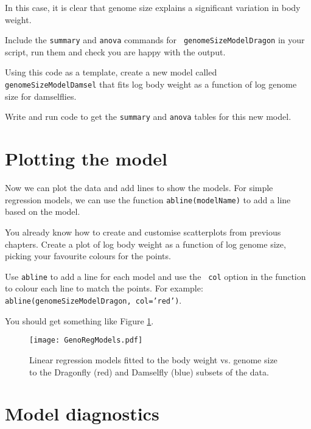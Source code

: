 In this case, it is clear that genome size explains a significant 
variation in body weight. 

\begin{compactitem}[$\quad\star$]
	\item Include the {\tt summary} and {\tt anova} commands for {\tt 
	genomeSizeModelDragon} in your script, run them and check you are 
	happy with the output.
	\item Using this code as a template, create a new model called {\tt 
	genomeSizeModelDamsel} that fits log body weight as a function of log 
	genome size for damselflies.
	\item Write and run code to get the  {\tt summary} and {\tt anova} 
	tables for this new model.
\end{compactitem}

\section{Plotting the model}

Now we can plot the data and add lines to show the models. For simple 
regression models, we can use the function {\tt abline(modelName)} to 
add a line based on the model.
\begin{compactitem}[$\quad\star$]
 \item You already know how to create and customise scatterplots from 
 previous chapters. Create a plot of log body weight as a function of 
 log genome size, picking your favourite colours for the points.
 \item Use {\tt abline} to add a line for each model and use the {\tt 
 col} option in the function to colour each line to match the points. 
 For example: {\tt abline(genomeSizeModelDragon, col='red')}.
\end{compactitem}

You should get something like Figure \ref{fig:GenoRegModels}.

\begin{figure} \centering
	\texttt{[image: GenoRegModels.pdf]}
	\caption{Linear regression models fitted to the body weight vs. 
	genome size to the Dragonfly (red) and Damselfly (blue) subsets of 
	the data.}
	\label{fig:GenoRegModels}
\end{figure}

\section{Model diagnostics}

